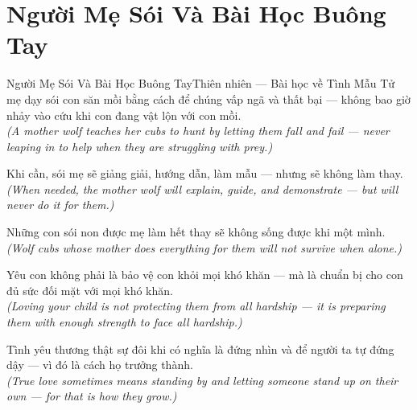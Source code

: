 \section{Người Mẹ Sói Và Bài Học Buông Tay}
\begin{truyen}{Người Mẹ Sói Và Bài Học Buông Tay}{Thiên nhiên --- Bài học về Tình Mẫu Tử}
 mẹ dạy sói con săn mồi bằng cách để chúng vấp ngã và thất bại --- không bao giờ nhảy vào cứu khi con đang vật lộn với con mồi.\\[4pt]
\textit{(A mother wolf teaches her cubs to hunt by letting them fall and fail --- never leaping in to help when they are struggling with prey.)}

Khi cần, sói mẹ sẽ giảng giải, hướng dẫn, làm mẫu --- nhưng sẽ không làm thay.\\[4pt]
\textit{(When needed, the mother wolf will explain, guide, and demonstrate --- but will never do it for them.)}

Những con sói non được mẹ làm hết thay sẽ không sống được khi một mình.\\[4pt]
\textit{(Wolf cubs whose mother does everything for them will not survive when alone.)}

Yêu con không phải là bảo vệ con khỏi mọi khó khăn --- mà là chuẩn bị cho con đủ sức đối mặt với mọi khó khăn.\\[4pt]
\textit{(Loving your child is not protecting them from all hardship --- it is preparing them with enough strength to face all hardship.)}

\end{truyen}
\begin{baihoc}
  Tình yêu thương thật sự đôi khi có nghĩa là đứng nhìn và để người ta tự đứng dậy --- vì đó là cách họ trưởng thành.\\[4pt]
  \textit{(True love sometimes means standing by and letting someone stand up on their own --- for that is how they grow.)}
\end{baihoc}
